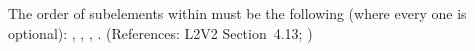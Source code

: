 The order of subelements within \Reaction must be the following
(where every one is optional): ,
, ,
.  (References: L2V2 Section~4.13; )
